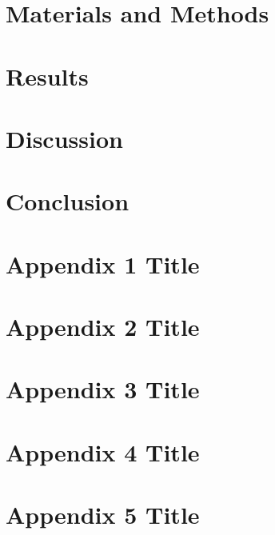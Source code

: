 \documentclass[12pt,oneside]{report}
\begin{document}
\chapter{Materials and Methods}


\chapter{Results}


\chapter{Discussion}



\chapter{Conclusion}





\begin{appendices}
	\chapter{Appendix 1 Title}
	
	\chapter{Appendix 2 Title}
		
	\chapter{Appendix 3 Title}
		
	\chapter{Appendix 4 Title}
		
	\chapter{Appendix 5 Title}
		
\end{appendices}
\end{document}
